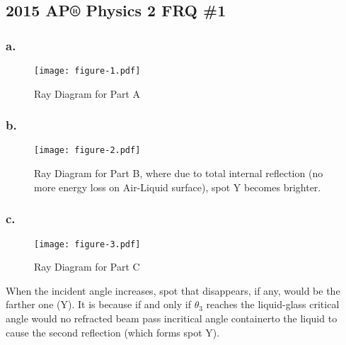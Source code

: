 \documentclass{elegantpaper}
\begin{document}
\subsection{2015 AP® Physics 2 FRQ \#1}
\subsubsection*{a.}
\begin{figure}[!ht]
	\centering
	\texttt{[image: figure-1.pdf]}
	\caption{Ray Diagram for Part A}
	\centering
  \label{label:f1}
\end{figure}
\subsubsection*{b.}
\begin{figure}[!ht]
	\centering
	\texttt{[image: figure-2.pdf]}
	\caption{Ray Diagram for Part B, where due to total internal reflection (no more energy loss on Air-Liquid surface), spot Y becomes brighter.}
	\centering
  \label{label:f1}
\end{figure}
\clearpage
\subsubsection*{c.}
\begin{figure}[!ht]
	\centering
	\texttt{[image: figure-3.pdf]}
	\caption{Ray Diagram for Part C}
	\centering
  \label{label:f1}
\end{figure}
When the incident angle increases, spot that disappears, if any, would be the farther one (Y). It is because if and only if $\theta_3$ reaches the liquid-glass critical angle would no refracted beam pass incritical angle containerto the liquid to cause the second reflection (which forms spot Y).
\end{document}
